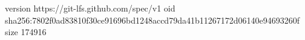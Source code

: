 version https://git-lfs.github.com/spec/v1
oid sha256:7802f0ad83810f30ce91696bd1248accd79da41b11267172d06140e94693260f
size 174916
